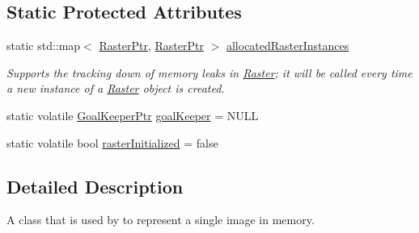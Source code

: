 \subsection*{Static Protected Attributes}
\begin{DoxyCompactItemize}
\item 
static std\+::map$<$ \hyperlink{class_k_k_b_1_1_raster_aefa532857fd6aa9eb53f79da55a97c5a}{Raster\+Ptr}, \hyperlink{class_k_k_b_1_1_raster_aefa532857fd6aa9eb53f79da55a97c5a}{Raster\+Ptr} $>$ \hyperlink{class_k_k_b_1_1_raster_a58c233ff55c2a1fa1b021776e7437c27}{allocated\+Raster\+Instances}
\begin{DoxyCompactList}\small\item\em Supports the tracking down of memory leaks in \hyperlink{class_k_k_b_1_1_raster}{Raster}; it will be called every time a new instance of a \textquotesingle{}\hyperlink{class_k_k_b_1_1_raster}{Raster}\textquotesingle{} object is created. \end{DoxyCompactList}\item 
static volatile \hyperlink{namespace_k_k_b_ae74d71076d6a6eb363f18a563ac0785a}{Goal\+Keeper\+Ptr} \hyperlink{class_k_k_b_1_1_raster_a6ac10b7d375feef9d68f8af61107687d}{goal\+Keeper} = N\+U\+LL
\item 
static volatile bool \hyperlink{class_k_k_b_1_1_raster_a2610974dbde577985214db37444f5560}{raster\+Initialized} = false
\end{DoxyCompactItemize}


\subsection{Detailed Description}
A class that is used by to represent a single image in memory. 


